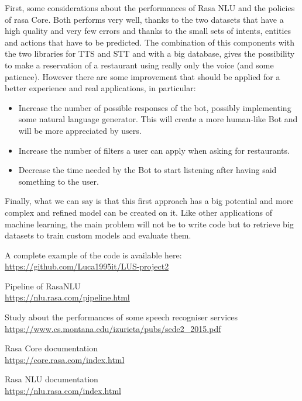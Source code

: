 \documentclass[11pt,a4paper]{article}
\begin{document}
First, some considerations about the performances of Rasa NLU and the policies of rasa Core. Both performs very well, thanks to the two datasets that have a high quality and very few errors and thanks to the small sets of intents, entities and actions that have to be predicted. The combination of this components with the two libraries for TTS and STT and with a big database, gives the possibility to make a reservation of a restaurant using really only the voice (and some patience). However there are some improvement that should be applied for a better experience and real applications, in particular:
\begin{itemize}
\item Increase the number of possible responses of the bot, possibly implementing some natural language generator. This will create a more human-like Bot and will be more appreciated by users.
\item Increase the number of filters a user can apply when asking for restaurants.
\item Decrease the time needed by the Bot to start listening after having said something to the user.
\end{itemize}
Finally, what we can say is that this first approach has a big potential and more complex and refined model can be created on it. Like other applications of machine learning, the main problem will not be to write code but to retrieve big datasets to train custom models and evaluate them.

A complete example of the code is available here: \url{https://github.com/Luca1995it/LUS-project2}

\bigskip


\begin{thebibliography}{2}

Pipeline of RasaNLU \\
\url{https://nlu.rasa.com/pipeline.html}

Study about the performances of some speech recogniser services \\
\url{https://www.cs.montana.edu/izurieta/pubs/sede2_2015.pdf}

Rasa Core documentation \\
\url{https://core.rasa.com/index.html}

Rasa NLU documentation \\
\url{https://nlu.rasa.com/index.html}

\end{thebibliography}
\end{document}
